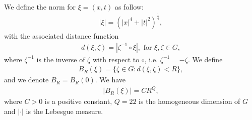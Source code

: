 \documentclass[10pt,a4paper]{amsart}
\numberwithin{equation}{section}
\begin{document}
We define the norm for $\xi=(x,t)$ as follow:
\begin{align*}
    |\xi|=(|x|^4+|t|^2)^\frac{1}{4},
\end{align*}
with the associated distance function 
\begin{align*}
    d(\xi,\zeta)=|\zeta^{-1}\circ\xi|,\,\,\textrm{for}\,\,\xi,\zeta \in G,
\end{align*}
where $\zeta^{-1}$ is the inverse of $\zeta$ with respect to $\circ$, i.e. $\zeta^{-1}=-\zeta$.
We define
\begin{align*}
    B_R(\xi)=\{\zeta\in G:d(\xi, \zeta)<R\},
\end{align*}
and we denote $B_R=B_R(0)$. We have
\begin{align*}
    |B_R(\xi)|=CR^Q,
\end{align*}
where $C>0$ is a positive constant, $Q=22$ is the homogeneous dimension of $G$ and $|\cdot|$ is the Lebesgue measure.
\end{document}

